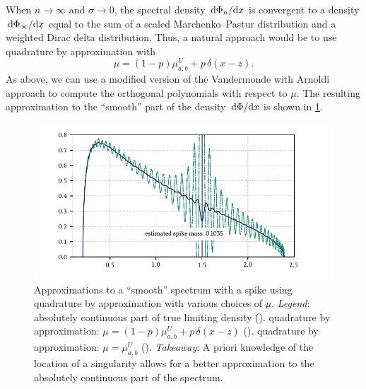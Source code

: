 When \( n\to\infty \) and \( \sigma \to 0 \), the spectral density \( \,\textup{d}\Phi_n/\textup{d}{x} \) is convergent to a density \( \,\textup{d}\Phi_\infty/\textup{d}{x} \) equal to the sum of a scaled Marchenko--Pastur distribution and a weighted Dirac delta distribution. 
Thus, a natural approach would be to use quadrature by approximation with
\begin{equation*}
    \mu = (1-p) \mu_{a,b}^{U} + p \,\delta(x-z).
\end{equation*}
As above, we can use a modified version of the Vandermonde with Arnoldi approach to compute the orthogonal polynomials with respect to \( \mu \). 
The resulting approximation to the ``smooth'' part of the density \( \,\textup{d}\Phi/\textup{d}{x} \) is shown in \cref{fig:RM_spike}.

\begin{figure}[htb]
\includegraphics[width=\textwidth]{imgs/ch4_RM_AQ_spiked.pdf}
    \caption[{Approximations to a ``smooth'' spectrum with a spike using quadrature by approximation with various choices of \( \mu \).}]{%
    Approximations to a ``smooth'' spectrum with a spike using quadrature by approximation with various choices of \( \mu \).
    \hspace{.25em}\emph{Legend}:
    absolutely continuous part of true limiting density
    ({\protect{}}).
    quadrature by approximation: \( \mu = (1-p) \mu_{a,b}^{U} + p \,\delta(x -z) \)
    ({\protect{}}).
    quadrature by approximation: \( \mu = \mu_{a,b}^U \) 
    ({\protect{}}).
    \hspace{.25em}\emph{Takeaway}: A priori knowledge of the location of a singularity allows for a better approximation to the absolutely continuous part of the spectrum. 
    }
\label{fig:RM_spike}
\end{figure}



